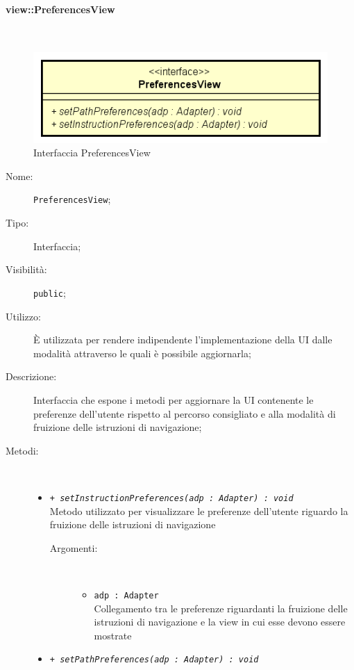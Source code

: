 \documentclass[../DefinizioneDiProdotto.tex]{subfiles}
\begin{document}
\paragraph{view::PreferencesView}
\
\begin{figure}[H]
	\centering
	\includegraphics[width=\maxwidth]{img/PreferencesView.png}
	\caption{Interfaccia PreferencesView}\label{fig:view::PreferencesView} 
\end{figure}
\begin{description}
	\item[Nome:] \texttt{PreferencesView};
	\item[Tipo:] Interfaccia;
	\item[Visibilità:] \texttt{public};
	\item[Utilizzo:] È utilizzata per rendere indipendente l'implementazione della UI dalle modalità attraverso le quali è possibile aggiornarla;
	\item[Descrizione:] Interfaccia che espone i metodi per aggiornare la UI contenente le preferenze dell'utente rispetto al percorso consigliato e alla modalità di fruizione delle istruzioni di navigazione;
	\item[Metodi:] \
	\begin{itemize}
		\item \texttt{+ \textit{setInstructionPreferences(adp : Adapter) : void}}\\
		Metodo utilizzato per visualizzare le preferenze dell'utente riguardo la fruizione delle istruzioni di navigazione
		\begin{description}
			\item[Argomenti:] \
			\begin{itemize}
				\item \texttt{adp : Adapter}\\
				Collegamento tra le preferenze riguardanti la fruizione delle istruzioni di navigazione e la view in cui esse devono essere mostrate\end{itemize}
		\end{description}
		\item \texttt{+ \textit{setPathPreferences(adp : Adapter) : void}}\\

\end{itemize}
\end{description}
\end{document}
